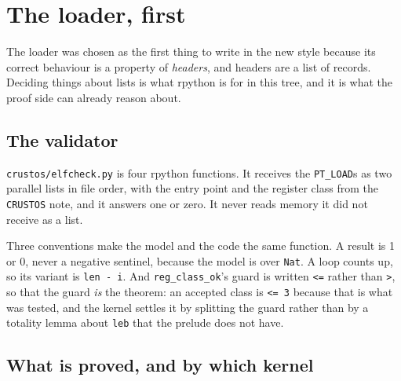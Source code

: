 \documentclass[11pt]{article}
\begin{document}
\section{The loader, first}

The loader was chosen as the first thing to write in the new style because
its correct behaviour is a property of \emph{headers}, and headers are a
list of records.  Deciding things about lists is what rpython is for in
this tree, and it is what the proof side can already reason about.

\subsection{The validator}

\texttt{crustos/elfcheck.py} is four rpython functions.  It receives the
\texttt{PT\_LOAD}s as two parallel lists in file order, with the entry
point and the register class from the \texttt{CRUSTOS} note, and it answers
one or zero.  It never reads memory it did not receive as a list.



Three conventions make the model and the code the same function.  A
result is 1 or 0, never a negative sentinel, because the model is over
\texttt{Nat}.  A loop counts up, so its variant is \texttt{len - i}.  And
\texttt{reg\_class\_ok}'s guard is written \texttt{<=} rather than
\texttt{>}, so that the guard \emph{is} the theorem: an accepted class is
\texttt{<= 3} because that is what was tested, and the kernel settles it by
splitting the guard rather than by a totality lemma about \texttt{leb} that
the prelude does not have.

\subsection{What is proved, and by which kernel}
\end{document}
